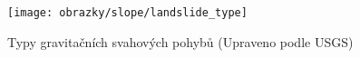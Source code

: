 \begin{figure}
	\centering
	\texttt{[image: obrazky/slope/landslide\_type]}
	\caption{Typy gravitačních svahových pohybů (Upraveno podle USGS)}
	\label{fig:landslidetype}
\end{figure}



